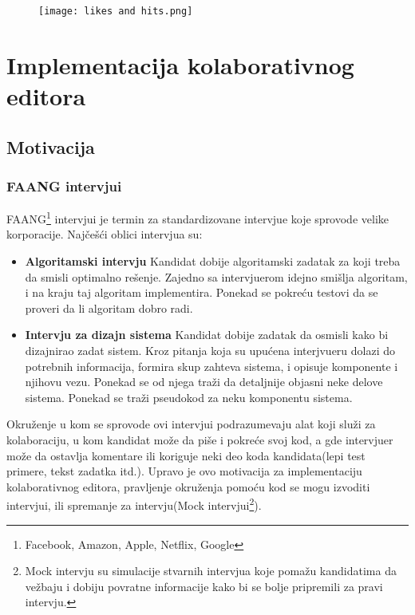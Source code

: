 \documentclass[12pt]{article}
\newcommand{\startnewsection}{
    \clearpage %
    \ifodd\value{page}\else %
        \hbox{} %
        \newpage %
    \fi
}
\begin{document}
\begin{figure}[h]
	\centering
	\texttt{[image: likes and hits.png]}
	\label{fig:nls_demo}
\end{figure}

\startnewsection

\section{Implementacija kolaborativnog editora}

\subsection{Motivacija}

\subsubsection{FAANG intervjui}

FAANG\footnote{Facebook, Amazon, Apple, Netflix, Google} intervjui je termin za standardizovane intervjue koje sprovode velike korporacije. Najčešći oblici intervjua su:

\begin{itemize}
    \item \textbf{Algoritamski intervju} Kandidat dobije algoritamski zadatak za koji treba da smisli optimalno rešenje. Zajedno sa intervjuerom idejno smišlja algoritam, i na kraju taj algoritam implementira. Ponekad se pokreću testovi da se proveri da li algoritam dobro radi.

    \item \textbf{Intervju za dizajn sistema} Kandidat dobije zadatak da osmisli kako bi dizajnirao zadat sistem. Kroz pitanja koja su upućena interjvueru dolazi do potrebnih informacija, formira skup zahteva sistema, i opisuje komponente i njihovu vezu. Ponekad se od njega traži da detaljnije objasni neke delove sistema. Ponekad se traži pseudokod za neku komponentu sistema.
\end{itemize}

Okruženje u kom se sprovode ovi intervjui podrazumevaju alat koji služi za kolaboraciju, u kom kandidat može da piše i pokreće svoj kod, a gde intervjuer može da ostavlja komentare ili koriguje neki deo koda kandidata(lepi test primere, tekst zadatka itd.). Upravo je ovo motivacija za implementaciju kolaborativnog editora, pravljenje okruženja pomoću kod se mogu izvoditi intervjui, ili spremanje za intervju(Mock intervjui\footnote{Mock intervju su simulacije stvarnih intervjua koje pomažu kandidatima da vežbaju i dobiju povratne informacije kako bi se bolje pripremili za pravi intervju.}).
\end{document}
